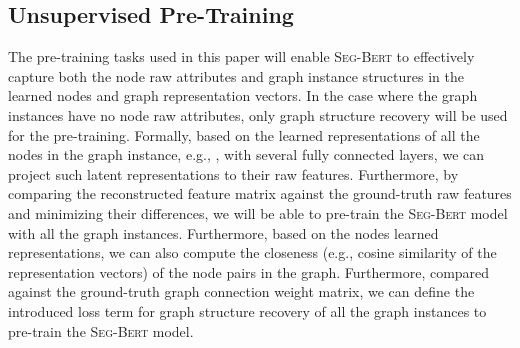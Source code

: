 \documentclass{article}
\newcommand{\our}{\textsc{Seg-Bert}}
\begin{document}
\subsection{Unsupervised Pre-Training}

The pre-training tasks used in this paper will enable {\our} to effectively capture both the node raw attributes and graph instance structures in the learned nodes and graph representation vectors. In the case where the graph instances have no node raw attributes, only graph structure recovery will be used for the pre-training. Formally, based on the learned representations  of all the nodes in the graph instance, e.g., , with several fully connected layers, we can project such latent representations to their raw features. Furthermore, by comparing the reconstructed feature matrix against the ground-truth raw features and minimizing their differences, we will be able to pre-train the {\our} model with all the graph instances. Furthermore, based on the nodes learned representations, we can also compute the closeness (e.g., cosine similarity of the representation vectors) of the node pairs in the graph. Furthermore, compared against the ground-truth graph connection weight matrix, we can define the introduced loss term for graph structure recovery of all the graph instances to pre-train the {\our} model.
\end{document}
